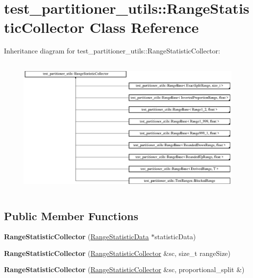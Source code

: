\hypertarget{classtest__partitioner__utils_1_1RangeStatisticCollector}{}\section{test\+\_\+partitioner\+\_\+utils\+:\+:Range\+Statistic\+Collector Class Reference}
\label{classtest__partitioner__utils_1_1RangeStatisticCollector}
Inheritance diagram for test\+\_\+partitioner\+\_\+utils\+:\+:Range\+Statistic\+Collector\+:\begin{figure}[H]
\begin{center}
\leavevmode
\includegraphics[height=7.000000cm]{classtest__partitioner__utils_1_1RangeStatisticCollector}
\end{center}
\end{figure}
\subsection*{Public Member Functions}
\begin{DoxyCompactItemize}
\item 
\hypertarget{classtest__partitioner__utils_1_1RangeStatisticCollector_aacc75fe8ff6656f3c8d958b0ee2e17cf}{}{\bfseries Range\+Statistic\+Collector} (\hyperlink{structtest__partitioner__utils_1_1RangeStatisticData}{Range\+Statistic\+Data} $\ast$statistic\+Data)\label{classtest__partitioner__utils_1_1RangeStatisticCollector_aacc75fe8ff6656f3c8d958b0ee2e17cf}

\item 
\hypertarget{classtest__partitioner__utils_1_1RangeStatisticCollector_a60c1807ddf21a0cd150a780d5a15ee97}{}{\bfseries Range\+Statistic\+Collector} (\hyperlink{classtest__partitioner__utils_1_1RangeStatisticCollector}{Range\+Statistic\+Collector} \&sc, size\+\_\+t range\+Size)\label{classtest__partitioner__utils_1_1RangeStatisticCollector_a60c1807ddf21a0cd150a780d5a15ee97}

\item 
\hypertarget{classtest__partitioner__utils_1_1RangeStatisticCollector_a84a86c6719e884119e594258d76e18cd}{}{\bfseries Range\+Statistic\+Collector} (\hyperlink{classtest__partitioner__utils_1_1RangeStatisticCollector}{Range\+Statistic\+Collector} \&sc, proportional\+\_\+split \&)\label{classtest__partitioner__utils_1_1RangeStatisticCollector_a84a86c6719e884119e594258d76e18cd}

\end{DoxyCompactItemize}


